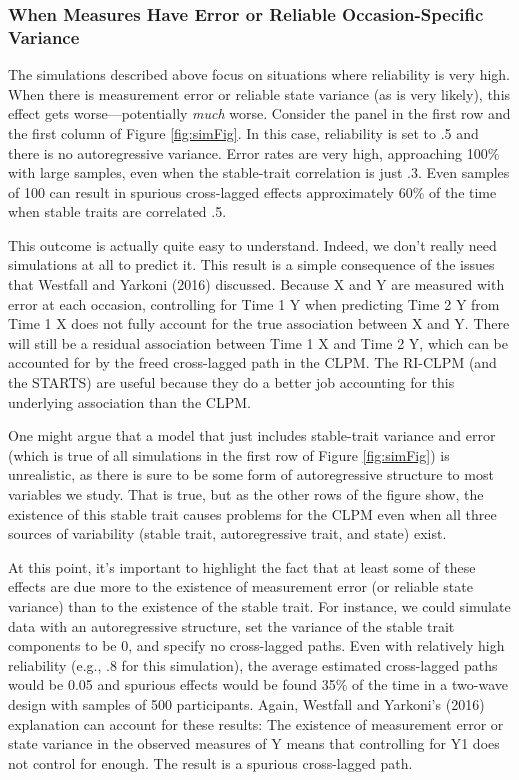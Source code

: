 \documentclass[
  english,
  man,floatsintext]{apa6}
\begin{document}
\hypertarget{when-measures-have-error-or-reliable-occasion-specific-variance}{%
\subsubsection{When Measures Have Error or Reliable Occasion-Specific Variance}\label{when-measures-have-error-or-reliable-occasion-specific-variance}}

The simulations described above focus on situations where reliability is very high. When there is measurement error or reliable state variance (as is very likely), this effect gets worse---potentially \emph{much} worse. Consider the panel in the first row and the first column of Figure \ref{fig:simFig}. In this case, reliability is set to .5 and there is no autoregressive variance. Error rates are very high, approaching 100\% with large samples, even when the stable-trait correlation is just .3. Even samples of 100 can result in spurious cross-lagged effects approximately 60\% of the time when stable traits are correlated .5.

This outcome is actually quite easy to understand. Indeed, we don't really need simulations at all to predict it. This result is a simple consequence of the issues that Westfall and Yarkoni (2016) discussed. Because X and Y are measured with error at each occasion, controlling for Time 1 Y when predicting Time 2 Y from Time 1 X does not fully account for the true association between X and Y. There will still be a residual association between Time 1 X and Time 2 Y, which can be accounted for by the freed cross-lagged path in the CLPM. The RI-CLPM (and the STARTS) are useful because they do a better job accounting for this underlying association than the CLPM.

One might argue that a model that just includes stable-trait variance and error (which is true of all simulations in the first row of Figure \ref{fig:simFig}) is unrealistic, as there is sure to be some form of autoregressive structure to most variables we study. That is true, but as the other rows of the figure show, the existence of this stable trait causes problems for the CLPM even when all three sources of variability (stable trait, autoregressive trait, and state) exist.

At this point, it's important to highlight the fact that at least some of these effects are due more to the existence of measurement error (or reliable state variance) than to the existence of the stable trait. For instance, we could simulate data with an autoregressive structure, set the variance of the stable trait components to be 0, and specify no cross-lagged paths. Even with relatively high reliability (e.g., .8 for this simulation), the average estimated cross-lagged paths would be 0.05 and spurious effects would be found 35\% of the time in a two-wave design with samples of 500 participants. Again, Westfall and Yarkoni's (2016) explanation can account for these results: The existence of measurement error or state variance in the observed measures of Y means that controlling for Y1 does not control for enough. The result is a spurious cross-lagged path.
\end{document}

